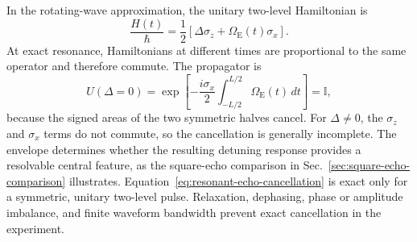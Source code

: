 In the rotating-wave approximation, the unitary two-level Hamiltonian is
\begin{equation}
    \frac{H(t)}{\hbar}
    =\frac{1}{2}\left[\Delta\sigma_z
    +\Omega_{\mathrm{E}}(t)\sigma_x\right].
    \label{eq:echo-two-level-hamiltonian}
\end{equation}
At exact resonance, Hamiltonians at different times are proportional to the
same operator and therefore commute.  The propagator is
\begin{equation}
    U(\Delta=0)
    =\exp\!\left[-\frac{i\sigma_x}{2}
      \int_{-L/2}^{L/2}\Omega_{\mathrm{E}}(t)\,dt\right]
    =\mathbb{I},
    \label{eq:resonant-echo-cancellation}
\end{equation}
because the signed areas of the two symmetric halves cancel.  For
$\Delta\ne0$, the $\sigma_z$ and $\sigma_x$ terms do not commute, so the
cancellation is generally incomplete. The envelope determines whether the
resulting detuning response provides a resolvable central feature, as the
square-echo comparison in Sec.~\ref{sec:square-echo-comparison} illustrates.
Equation~\eqref{eq:resonant-echo-cancellation} is exact only for a symmetric,
unitary two-level pulse.  Relaxation, dephasing, phase or amplitude imbalance,
and finite waveform bandwidth prevent exact cancellation in the experiment.
